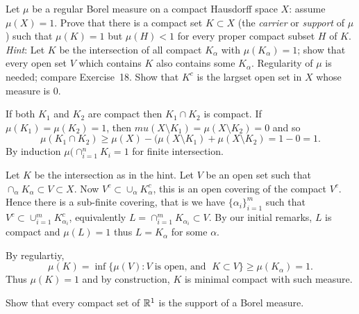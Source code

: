 \begin{enumerate}
\begin{excopy}
Let \(\mu\) be a regular Borel measure on a compact Hausdorff space $X$:
assume \(\mu(X) = 1\). Prove that there is a compact set \(K\subset X\)
(the \emph{carrier} or \emph{support} of \(\mu\))
such that \(\mu(K) = 1\) but \(\mu(H)<1\)
for every proper compact subset $H$ of $K$.
\emph{Hint}: Let $K$ be the intersection of all compact \(K_\alpha\) with
\(\mu(K_\alpha)=1\);
show that every open set $V$ which contains $K$ also contains some \(K_\alpha\).
Regularity of \(\mu\) is needed; compare Exercise~18.
Show that \(K^c\) is the largset open set in $X$ whose measure is $0$.
\end{excopy}

If both \(K_1\) and \(K_2\) are compact then
\(K_1 \cap K_2\) is compact. If
\(\mu(K_1) = \mu(K_2) = 1\), then
\(mu(X\setminus K_1) = \mu(X\setminus K_2) = 0\) and so
\begin{equation*}
\mu(K_1 \cap K_2) \geq \mu(X) - (\mu(X\setminus K_1) + \mu(X\setminus K_2) =
        1 - 0 = 1.
\end{equation*}
By induction \(\mu(\cap_{i=1}^n K_i = 1\) for finite intersection.

Let $K$ be the intersection as in the hint.
Let $V$ be an open set such that \(\cap_\alpha K_\alpha \subset V \subset X\).
Now \(V^c \subset \cup_\alpha K_\alpha^c\), this is an open covering
of the compact \(V^c\). Hence there is a sub-finite covering,
that is we have \(\{\alpha_i\}_{i=1}^m\) such that
\(V^c \subset \cup_{i=1}^m K_{\alpha_i}^c\), equivalently
\(L = \cap_{i=1}^m K_{\alpha_i} \subset V\). By our initial remarks,
$L$ is compact and \(\mu(L)=1\) thus \(L=K_\alpha\) for some \(\alpha\).

By regulartiy,
\begin{equation*}
\mu(K) = \inf \{\mu(V): V\;\textrm{is open, and }\; K\subset V\}
       \geq \mu(K_\alpha) = 1.
\end{equation*}
Thus \(\mu(K) = 1\) and by construction, $K$ is minimal compact with
such measure.


\begin{excopy}
Show \label{ex:2:12}
that every compact set of \(\mathbb{R}^1\) is the support of a Borel measure.
\end{excopy}


\end{enumerate}
